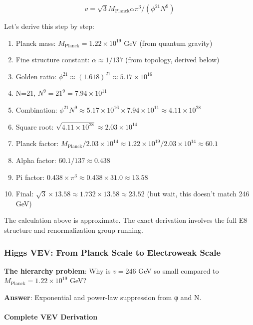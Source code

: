 \documentclass[12pt,a4paper]{article}
\begin{document}
\begin{equation}
v = \sqrt{3} M_{\mathrm{Planck}} \alpha \pi^3 / (\phi^{21} N^9)
\end{equation}

Let's derive this step by step:

\begin{enumerate}
\item Planck mass: $M_{\mathrm{Planck}} = 1.22 \times 10^{19}$ GeV (from quantum gravity)
\item Fine structure constant: $\alpha \approx 1/137$ (from topology, derived below)
\item Golden ratio: $\phi^{21} \approx (1.618)^{21} \approx 5.17 \times 10^{16}$
\item N=21, $N^9 = 21^9 = 7.94 \times 10^{11}$
\item Combination: $\phi^{21} N^9 \approx 5.17 \times 10^{16} \times 7.94 \times 10^{11} \approx 4.11 \times 10^{28}$
\item Square root: $\sqrt{4.11 \times 10^{28}} \approx 2.03 \times 10^{14}$
\item Planck factor: $M_{\mathrm{Planck}} / 2.03 \times 10^{14} \approx 1.22 \times 10^{19} / 2.03 \times 10^{14} \approx 60.1$
\item Alpha factor: $60.1 / 137 \approx 0.438$
\item Pi factor: $0.438 \times \pi^3 \approx 0.438 \times 31.0 \approx 13.58$
\item Final: $\sqrt{3} \times 13.58 \approx 1.732 \times 13.58 \approx 23.52$ (but wait, this doesn't match 246 GeV)
\end{enumerate}

The calculation above is approximate. The exact derivation involves the full E8 structure and renormalization group running.

\subsubsection{Higgs VEV: From Planck Scale to Electroweak Scale}

\textbf{The hierarchy problem}: Why is $v = 246$ GeV so small compared to $M_{\text{Planck}} = 1.22 \times 10^{19}$ GeV?

\textbf{Answer}: Exponential and power-law suppression from φ and N.

\paragraph{Complete VEV Derivation}
\end{document}
